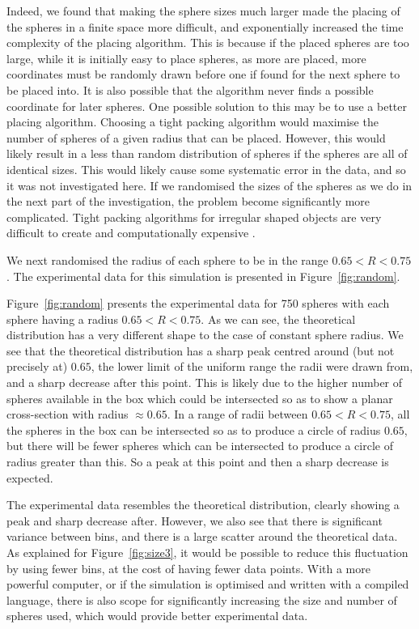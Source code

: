 \documentclass[journal]{IEEEtran}
\begin{document}
Indeed, we found that making the sphere sizes much larger made the placing of
the spheres in a finite space more difficult, and exponentially increased the
time complexity of the placing algorithm. This is because if the placed spheres
are too large, while it is initially easy to place spheres, as more are placed,
more coordinates must be randomly drawn before one if found for the next sphere
to be placed into. It is also possible that the algorithm never finds a possible
coordinate for later spheres. One possible solution to this may be to use a
better placing algorithm. Choosing a tight packing algorithm \cite{Chen2001} would
maximise the number of spheres of a given radius that can be placed. However,
this would likely result in a less than random distribution of spheres if the
spheres are all of identical sizes. This would likely cause some systematic
error in the data, and so it was not investigated here. If we randomised the
sizes of the spheres as we do in the next part of the investigation, the problem
become significantly more complicated. Tight packing algorithms for irregular
shaped objects are very difficult to create and computationally expensive
\cite{Ma2018}. 

We next randomised the radius of each sphere to be in the range $0.65 < R <
0.75$. The experimental data for this simulation is presented in
Figure~\ref{fig:random}.

Figure~\ref{fig:random} presents the experimental data for 750 spheres with each
sphere having a radius $0.65 < R < 0.75$. As we can see, the theoretical
distribution has a very different shape to the case of constant sphere
radius. We see that the theoretical distribution has a sharp peak centred around
(but not precisely at) $0.65$, the lower limit of the uniform range the radii
were drawn from, and a sharp decrease after this point. This is likely due to
the higher number of spheres available in the box which could be intersected so
as to show a planar cross-section with radius $\approx 0.65$. In a range of
radii between $0.65 < R < 0.75$, all the spheres in the box can be intersected
so as to produce a circle of radius $0.65$, but there will be fewer spheres
which can be intersected to produce a circle of radius greater than this. So a
peak at this point and then a sharp decrease is expected.

The experimental data resembles the theoretical distribution, clearly showing a
peak and sharp decrease after. However, we also see that there is significant
variance between bins, and there is a large scatter around the theoretical
data. As explained for Figure~\ref{fig:size3}, it would be possible to reduce
this fluctuation by using fewer bins, at the cost of having fewer data
points. With a more powerful computer, or if the simulation is optimised and
written with a compiled language, there is also scope for significantly
increasing the size and number of spheres used, which would provide better
experimental data.
\end{document}
